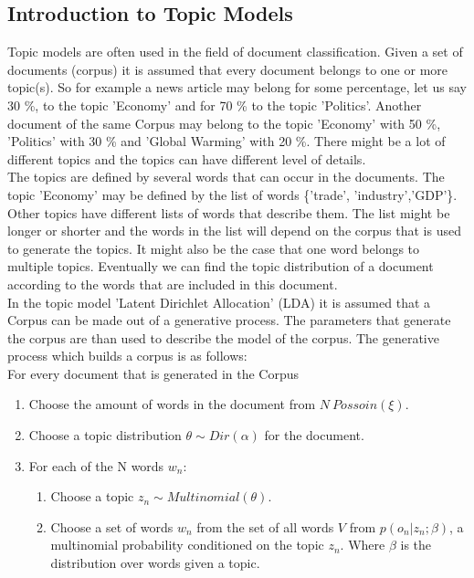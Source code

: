 \documentclass[11pt,a4paper]{article}
\begin{document}
\subsection{Introduction to Topic Models}
Topic models are often used in the field of document classification. Given a set of documents (corpus) it is assumed that every document belongs to one or more topic(s). So for example a news article may belong for some percentage, let us say 30 \%,  to the topic 'Economy' and for 70 \%  to the topic 'Politics'. Another document of the same Corpus may belong to the topic 'Economy' with 50 \%, 'Politics' with 30 \% and 'Global Warming' with 20 \%. There might be a lot of different topics and the topics can have different level of details. 
\\
The topics are defined by several words that can occur in the documents. The topic 'Economy' may be defined by the list of words \{'trade', 'industry','GDP'\}. Other topics have different lists of words that describe them. The list might be longer or shorter and the words in the list will depend on the corpus that is used to generate the topics. It might also be the case that one word belongs to multiple topics. Eventually we can find the topic distribution of a document according to the words that are included in this document.\\
In the topic model 'Latent Dirichlet Allocation' (LDA) it is assumed that a Corpus can be made out of a generative process. The parameters that generate the corpus are than used to describe the model of the corpus. The generative process which builds a corpus is as follows:
\\
For every document that is generated in the Corpus
\begin{enumerate}
 \item Choose the amount of words in the document from $N~Possoin(\xi)$.
 \item Choose a topic distribution $\theta \sim Dir(\alpha)$ for the document.
 \item For each of the N words $w_n$:
 
 \begin{enumerate}
  \item Choose a topic $z_n \sim Multinomial(\theta)$.
  \item Choose a set of words $w_n$ from the set of all words $V$ from $p(o_n |z_n;\beta)$, a multinomial probability conditioned on the topic $z_n$. Where $\beta$ is the distribution over words given a topic.
 \end{enumerate}

\end{enumerate}
\end{document}
